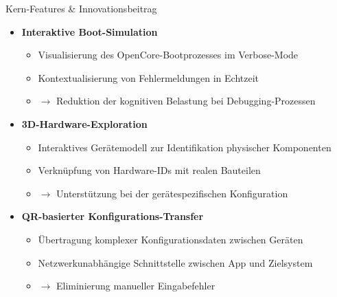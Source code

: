 \documentclass[10pt]{beamer}
\begin{document}
\begin{frame}{Kern-Features \& Innovationsbeitrag}
    \begin{itemize}
        \item \textbf{Interaktive Boot-Simulation}
        \begin{itemize}
            \item Visualisierung des OpenCore-Bootprozesses im Verbose-Mode
            \item Kontextualisierung von Fehlermeldungen in Echtzeit
            \item $\rightarrow$ Reduktion der kognitiven Belastung bei Debugging-Prozessen
        \end{itemize}
        
        \vspace{0.3cm}
        
        \item \textbf{3D-Hardware-Exploration}
        \begin{itemize}
            \item Interaktives Gerätemodell zur Identifikation physischer Komponenten
            \item Verknüpfung von Hardware-IDs mit realen Bauteilen
            \item $\rightarrow$ Unterstützung bei der gerätespezifischen Konfiguration
        \end{itemize}
        
        \vspace{0.3cm}
        
        \item \textbf{QR-basierter Konfigurations-Transfer}
        \begin{itemize}
            \item Übertragung komplexer Konfigurationsdaten zwischen Geräten
            \item Netzwerkunabhängige Schnittstelle zwischen App und Zielsystem
            \item $\rightarrow$ Eliminierung manueller Eingabefehler
        \end{itemize}
    \end{itemize}
\end{frame}
\end{document}
